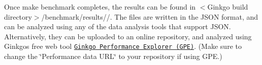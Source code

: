 Once {\ttfamily make benchmark} completes, the results can be found in {\ttfamily $<$Ginkgo build directory$>$/benchmark/results//}. The files are written in the J\+S\+ON format, and can be analyzed using any of the data analysis tools that support J\+S\+ON. Alternatively, they can be uploaded to an online repository, and analyzed using Ginkgo\textquotesingle{}s free web tool \href{https://ginkgo-project.github.io/gpe/}{\tt Ginkgo Performance Explorer (G\+PE)}. (Make sure to change the \char`\"{}\+Performance data U\+R\+L\char`\"{} to your repository if using G\+PE.) 